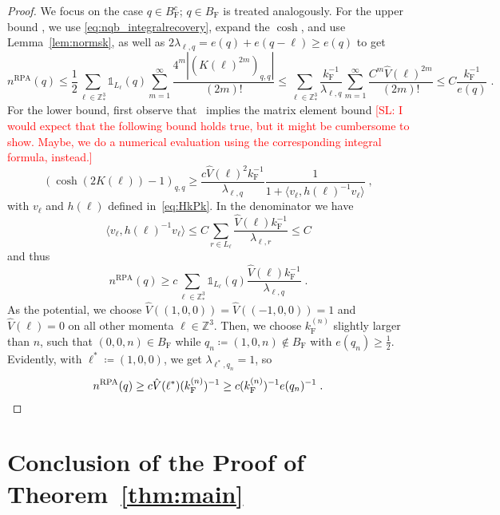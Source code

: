 \documentclass[12pt,a4paper]{article}
\numberwithin{equation}{section}
\newcommand{\ZZZ}{\mathbb{Z}}
\newcommand{\1}{\mathbb{I}}
\newcommand{\F}{\mathrm{F}}
\newcommand{\RPA}{\mathrm{RPA}}
\newcommand{\Z}{\mathbb{Z}}
\newcommand{\half}{\frac{1}{2}}
\theoremstyle{plain}
\theoremstyle{definition}
\theoremstyle{remark}
\theoremstyle{plain}
\theoremstyle{definition}
\theoremstyle{remark}
\begin{document}
\begin{proof}
We focus on the case $ q \in B_{\F}^c $; $ q \in B_{\F} $ is treated analogously. For the upper bound , we use \eqref{eq:nqb_integralrecovery}, expand the $ \cosh $, and use Lemma~\ref{lem:normsk}, as well as $ 2 \lambda_{\ell,q} = e(q) + e(q - \ell) \ge e(q) $ to get
\begin{equation}
	n^{\RPA}(q)
	\le \half \sum_{\ell \in \Z^3_*} \mathds{1}_{L_\ell}(q) \sum_{m=1}^{\infty} \frac{4^m |(K(\ell)^{2m})_{q,q}|}{(2m)!}
	\le \sum_{\ell \in \Z^3_*} \frac{k_{\F}^{-1}}{\lambda_{\ell,q}} \sum_{m=1}^{\infty} \frac{C^m \hat{V}(\ell)^{2m}}{(2m)!}
	\le C \frac{k_{\F}^{-1}}{e(q)} \;.
\end{equation}
For the lower bound, first observe that~\cite[Prop.~7.8]{CHN21} implies the matrix element bound \textcolor{red}{[SL: I would expect that the following bound holds true, but it might be cumbersome to show. Maybe, we do a numerical evaluation using the corresponding integral formula, instead.]} 
\begin{equation}
	(\cosh(2K(\ell)) - 1)_{q,q}
	\ge \frac{c \hat{V}(\ell)^2 k_{\F}^{-1}}{\lambda_{\ell,q}}
		\frac{1}{1 + \langle v_\ell, h(\ell)^{-1} v_\ell \rangle} \;,
\end{equation}
with $ v_\ell $ and $ h(\ell) $ defined in~\eqref{eq:HkPk}. In the denominator we have
\begin{equation}
	\langle v_\ell, h(\ell)^{-1} v_\ell \rangle \le C \sum_{r \in L_\ell} \frac{\hat{V}(\ell) k_{\F}^{-1}}{\lambda_{\ell,r}} \le C
\end{equation}
and thus
\begin{equation}
	n^{\RPA}(q)
	\ge c \sum_{\ell \in \Z^3_*} \mathds{1}_{L_\ell}(q)
		\frac{\hat{V}(\ell) k_{\F}^{-1}}{\lambda_{\ell,q}} \;.
\end{equation}
As the potential, we choose $ \hat{V}((1,0,0)) = \hat{V}((-1,0,0)) = 1 $ and $ \hat{V}(\ell) = 0 $ on all other momenta $ \ell \in \ZZZ^3 $. Then, we choose $ k_{\F}^{(n)} $ slightly larger than $ n $, such that $ (0,0,n) \in B_{\F} $ while $ q_n \coloneq (1,0,n) \notin B_{\F} $ with $ e(q_n) \ge \half $. Evidently, with $ \ell^* \coloneq (1,0,0) $, we get $ \lambda_{\ell^*, q_n} = 1 $, so
\[
	n^{\RPA}(q)
	\ge c \hat{V}(\ell^*) (k_{\F}^{(n)})^{-1}
	\ge c (k_{\F}^{(n)})^{-1} e(q_n)^{-1} \;. \qedhere
\]
\end{proof}



\section{Conclusion of the Proof of Theorem~\ref{thm:main}}
\label{sec:mainthmproof}
\end{document}
